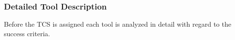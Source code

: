 
\subsubsection{Detailed Tool Description}\label{tool:tools}
Before the TCS is assigned each tool is analyzed in detail with regard to the success criteria. \\

